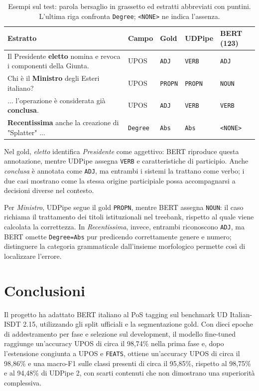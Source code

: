 \documentclass[12pt,a4paper]{report}
\begin{document}
\begin{table}[H]
\centering\small
\setlength{\tabcolsep}{4pt}
\renewcommand{\arraystretch}{1.05}
\begin{tabularx}{\textwidth}{>{\raggedright\arraybackslash}Xllll}
\toprule
Estratto & Campo & Gold & UDPipe & BERT (123)\\
\midrule
Il Presidente \textbf{eletto} nomina e revoca i componenti della Giunta. & UPOS & \texttt{ADJ} & \texttt{VERB} & \texttt{ADJ}\\
\addlinespace[3pt]
Chi è il \textbf{Ministro} degli Esteri italiano? & UPOS & \texttt{PROPN} & \texttt{PROPN} & \texttt{NOUN}\\
\addlinespace[3pt]
... l'operazione è considerata già \textbf{conclusa}. & UPOS & \texttt{ADJ} & \texttt{VERB} & \texttt{VERB}\\
\addlinespace[3pt]
\textbf{Recentissima} anche la creazione di "Splatter" ... & \texttt{Degree} & \texttt{Abs} & \texttt{Abs} & \texttt{<NONE>}\\
\bottomrule
\end{tabularx}
\caption{Esempi sul test: parola bersaglio in grassetto ed estratti abbreviati con puntini. L'ultima riga confronta \texttt{Degree}; \texttt{<NONE>} ne indica l'assenza.}
\label{tab:contextual-errors}
\end{table}

Nel gold, \emph{eletto} identifica \emph{Presidente} come aggettivo: BERT riproduce questa annotazione, mentre UDPipe assegna \texttt{VERB} e caratteristiche di participio. Anche \emph{conclusa} è annotata come \texttt{ADJ}, ma entrambi i sistemi la trattano come verbo; i due casi mostrano come la stessa origine participiale possa accompagnarsi a decisioni diverse nel contesto.

Per \emph{Ministro}, UDPipe segue il gold \texttt{PROPN}, mentre BERT assegna \texttt{NOUN}: il caso richiama il trattamento dei titoli istituzionali nel treebank, rispetto al quale viene calcolata la correttezza. In \emph{Recentissima}, invece, entrambi riconoscono \texttt{ADJ}, ma BERT omette \texttt{Degree=Abs} pur predicendo correttamente genere e numero; distinguere la categoria grammaticale dall'insieme morfologico permette così di localizzare l'errore.

\chapter{Conclusioni}
\label{chap:conclusions}

Il progetto ha adattato BERT italiano al PoS tagging sul benchmark UD Italian-ISDT 2.15, utilizzando gli split ufficiali e la segmentazione gold. Con dieci epoche di addestramento per fase e selezione sul development, il modello fine-tuned raggiunge un'accuracy UPOS di circa il 98,74\% nella prima fase e, dopo l'estensione congiunta a UPOS e \texttt{FEATS}, ottiene un'accuracy UPOS di circa il 98,86\% e una macro-F1 sulle classi presenti di circa il 95,85\%, rispetto al 98,75\% e al 94,48\% di UDPipe 2, con scarti contenuti che non dimostrano una superiorità complessiva.
\end{document}
